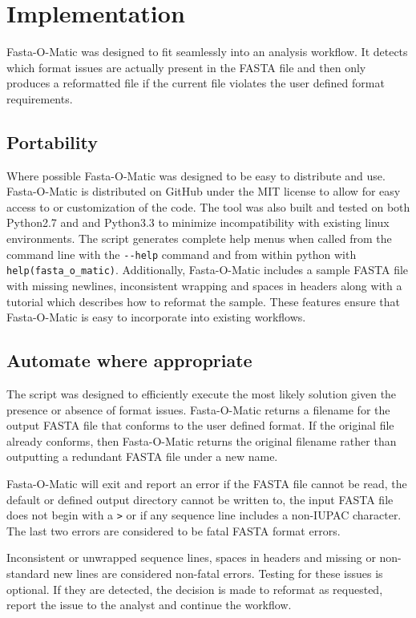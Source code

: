 \section{Implementation}

Fasta-O-Matic was designed to fit seamlessly into an analysis workflow. It detects which format issues are actually present in the FASTA file and then only produces a reformatted file if the current file violates the user defined format requirements. 


\subsection{Portability}

Where possible Fasta-O-Matic was designed to be easy to distribute and use. Fasta-O-Matic is distributed on GitHub under the MIT license to allow for easy access to or customization of the code. The tool was also built and tested on both Python2.7 and and Python3.3 to minimize incompatibility with existing linux environments. The script generates complete help menus when called from the command line with the \verb|--help| command and from within python with \verb|help(fasta_o_matic)|. Additionally, Fasta-O-Matic includes a sample FASTA file with missing newlines, inconsistent wrapping and spaces in headers along with a tutorial which describes how to reformat the sample. These features ensure that Fasta-O-Matic is easy to incorporate into existing workflows.

\subsection{Automate where appropriate} 

The script was designed to efficiently execute the most likely solution given the presence or absence of format issues. Fasta-O-Matic returns a filename for the output FASTA file that conforms to the user defined format. If the original file already conforms, then Fasta-O-Matic returns the original filename rather than outputting a redundant FASTA file under a new name.

Fasta-O-Matic will exit and report an error if the FASTA file cannot be read, the default or defined output directory cannot be written to, the input FASTA file does not begin with a \verb|>| or if any sequence line includes a non-IUPAC character. The last two errors are considered to be fatal FASTA format errors.

Inconsistent or unwrapped sequence lines, spaces in headers and missing or non-standard new lines are considered non-fatal errors. Testing for these issues is optional. If they are detected, the decision is made to reformat as requested, report the issue to the analyst and continue the workflow.

